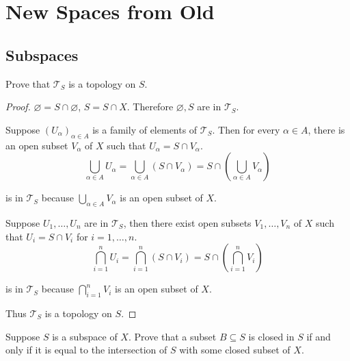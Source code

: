\chapter{New Spaces from Old}

\section*{Subspaces}

\begin{exercise}{3.1}
    Prove that $\mathscr{T}_{S}$ is a topology on $S$.
\end{exercise}

\begin{proof}
    $\varnothing = S\cap\varnothing$, $S = S\cap X$. Therefore $\varnothing, S$ are in $\mathscr{T}_{S}$.

    Suppose ${(U_{\alpha})}_{\alpha\in A}$ is a family of elements of $\mathscr{T}_{S}$. Then for every $\alpha\in A$, there is an open subset $V_{\alpha}$ of $X$ such that $U_{\alpha} = S\cap V_{\alpha}$.
    \[
        \bigcup_{\alpha\in A}U_{\alpha} = \bigcup_{\alpha\in A}(S\cap V_{\alpha}) = S\cap \left(\bigcup_{\alpha\in A}V_{\alpha}\right)
    \]

    is in $\mathscr{T}_{S}$ because $\bigcup_{\alpha\in A}V_{\alpha}$ is an open subset of $X$.

    Suppose $U_{1}, \ldots, U_{n}$ are in $\mathscr{T}_{S}$, then there exist open subsets $V_{1}, \ldots, V_{n}$ of $X$ such that $U_{i} = S\cap V_{i}$ for $i = 1,\ldots, n$.
    \[
        \bigcap^{n}_{i=1}U_{i} = \bigcap^{n}_{i=1}(S\cap V_{i}) = S\cap \left(\bigcap^{n}_{i=1}V_{i}\right)
    \]

    is in $\mathscr{T}_{S}$ because $\bigcap^{n}_{i=1}V_{i}$ is an open subset of $X$.

    Thus $\mathscr{T}_{S}$ is a topology on $S$.
\end{proof}

\begin{exercise}{3.2}\label{exercise:3.2}
    Suppose $S$ is a subspace of $X$. Prove that a subset $B\subseteq S$ is closed in $S$ if and only if it is equal to the intersection of $S$ with some closed subset of $X$.
\end{exercise}

